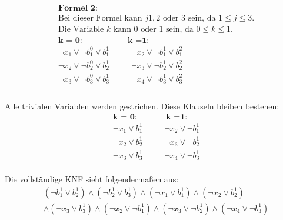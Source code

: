 \documentclass[a4,abstract=on]{scrartcl}
\begin{document}
\begin{align*}
&\textbf{Formel 2:}\\
& \text{Bei dieser Formel kann } j 1, 2 \text{ oder } 3 \text{ sein, da }1 \leq j \leq 3. \\
&\text{Die Variable } k \text{ kann } 0 \text{ oder } 1 \text{ sein, da } 0 \leq k \leq 1.\\
&\textbf{k = 0:} {~~~~~~~~~~~~~~~~~~~~~~~~~} \textbf{k =1:}\\
&\neg x_1 \vee \neg b_1^0 \vee b_1^1 {~~~~~~~~~~~~}\neg x_2 \vee \neg b_1^1 \vee b_1^2\\
&\neg x_2 \vee \neg b_2^0 \vee b_2^1 {~~~~~~~~~~~~} \neg x_3 \vee \neg b_2^1 \vee b_2^2\\
&\neg x_3 \vee \neg b_3^0 \vee b_3^1 {~~~~~~~~~~~~} \neg x_4 \vee \neg b_3^1 \vee b_3^2\\
\end{align*}
\ \\
Alle trivialen Variablen werden gestrichen. Diese Klauseln bleiben bestehen:\\
\begin{align*}
&\textbf{k = 0:} {~~~~~~~~~~~~~~~~}\textbf{k =1:}\\
&\neg x_1 \vee b_1^1{~~~~~~~~~~~~}\neg x_2 \vee \neg b_1^1 \\
&\neg x_2 \vee b_2^1{~~~~~~~~~~~~}\neg x_3 \vee \neg b_2^1 \\
&\neg x_3 \vee b_3^1{~~~~~~~~~~~~}\neg x_4 \vee \neg b_3^1 \\
\end{align*}

Die vollständige KNF sieht folgendermaßen aus:\\
\begin{align*}
&(\neg b_1^1 \vee b_2^1) \wedge (\neg b_2^1 \vee b_3^1) \wedge (\neg x_1 \vee b_1^1) \wedge (\neg x_2 \vee b_2^1)\\ &\wedge (\neg x_3 \vee b_3^1) \wedge (\neg x_2 \vee \neg b_1^1) \wedge (\neg x_3 \vee \neg b_2^1) \wedge (\neg x_4 \vee \neg b_3^1) \\
\end{align*}
\end{document}

